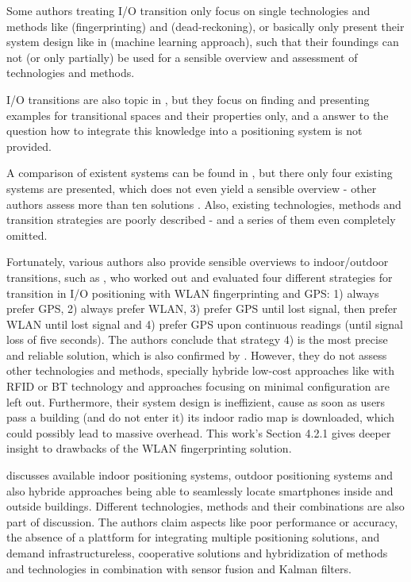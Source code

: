 Some authors treating I/O transition only focus on single technologies and methods like \cite{indoorFingerprinting} (fingerprinting) and \cite{drear} (dead-reckoning), or basically only present their system design like in \cite{machineLearningIO} (machine learning approach), such that their foundings can not (or only partially) be used for a sensible overview and assessment of technologies and methods.

I/O transitions are also topic in \cite{transitionalSpaces}, but they focus on finding and presenting examples for transitional spaces and their properties only, and a answer to the question how to integrate this knowledge into a positioning system is not provided.

A comparison of existent systems can be found in \cite{seamlessIOresearch}, but there only four existing systems are presented, which does not even yield a sensible overview - other authors assess more than ten solutions \cite{seamlessIOsolutions}. Also, existing technologies, methods and transition strategies are poorly described - and a series of them even completely omitted.

Fortunately, various authors also provide sensible overviews to indoor/outdoor transitions, such as \cite{streamspin}, who worked out and evaluated four different strategies for transition in I/O positioning with WLAN fingerprinting and GPS: 1) always prefer GPS, 2) always prefer WLAN, 3) prefer GPS until lost signal, then prefer WLAN until lost signal and 4) prefer GPS upon continuous readings (until signal loss of five seconds).
The authors conclude that strategy 4) is the most precise and reliable solution, which is also confirmed by \cite{seamlessIOresearch}.
However, they do not assess other technologies and methods, specially hybride low-cost approaches like with RFID or BT technology and approaches focusing on minimal configuration are left out. Furthermore, their system design is ineffizient, cause as soon as users pass a building (and do not enter it) its indoor radio map is downloaded, which could possibly lead to massive overhead.
This work's Section 4.2.1 gives deeper insight to drawbacks of the WLAN fingerprinting solution.

\cite{seamlessIOsolutions} discusses available indoor positioning systems, outdoor positioning systems and also hybride approaches being able to seamlessly locate smartphones inside and outside buildings. Different technologies, methods and their combinations are also part of discussion.
The authors claim aspects like poor performance or accuracy, the absence of a plattform for integrating multiple positioning solutions, and demand infrastructureless, cooperative solutions and hybridization of methods and technologies in combination with sensor fusion and Kalman filters.

